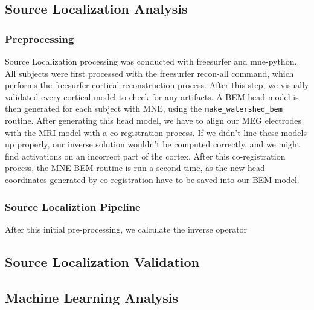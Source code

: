\documentclass[../main.tex]{subfiles}
\begin{document}
\subsection{Source Localization Analysis}
\subsubsection{Preprocessing}
Source Localization processing was conducted with freesurfer and mne-python. All subjects were first processed with the freesurfer recon-all command, which performs the freesurfer cortical reconstruction process. After this step, we visually validated every cortical model to check for any artifacts. A BEM head model is then generated for each subject with MNE, using the \texttt{make\_{}watershed\_{}bem} routine. After generating this head model, we have to align our MEG electrodes with the MRI model with a co-registration process. If we didn't line these models up properly, our inverse solution wouldn't be computed correctly, and we might find  activations on an incorrect part of the cortex. After this co-registration process, the MNE BEM routine is run a second time, as the new head coordinates generated by co-registration have to be saved into our BEM model.

\subsubsection{Source Localiztion Pipeline}
After this initial pre-processing, we calculate the inverse operator

\subsection{Source Localization Validation}


\subsection{Machine Learning Analysis}
\end{document}
